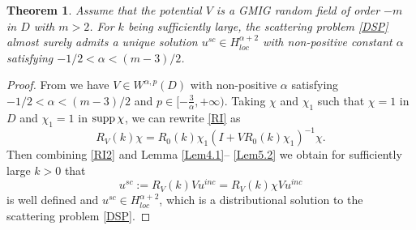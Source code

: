 \documentclass[reqno, 12pt]{amsart}
\newtheorem{Thm}{Theorem}[section]
\numberwithin{equation}{section}
\begin{document}
\begin{Thm}\label{wp}
    Assume that the potential $V$ is a GMIG random field of order $-m$ in $D $ with $m>2$. For $k$ being sufficiently large, the scattering problem \eqref{DSP} almost surely admits a unique solution $u^{sc} \in H^{\alpha+2}_{loc}$ with non-positive constant $\alpha$ satisfying $-1/2<\alpha<(m-3)/2$.
\end{Thm}
\begin{proof} 
From \cite{li2021inverse} we have $V \in W^{\alpha,p}(D)$ with non-positive $\alpha$ satisfying $-1/2<\alpha<(m-3)/2$ and $p \in [-\frac{3}{\alpha},+\infty)$. 
Taking $\chi$ and $\chi_1$ 
such that $\chi =1$ in $D $ and $\chi_1 =1$ in ${\rm supp}\, \chi$, we can rewrite \eqref{RI} as \begin{equation}\label{RI2}
 R_{ V}(k)\chi =  R_0(k) \chi_1 (I + VR_0(k)\chi_1)^{-1}\chi.
\end{equation}  Then combining \eqref{RI2} and Lemma \ref{Lem4.1}-- \ref{Lem5.2} we obtain for sufficiently large $k>0$ that \[
 u^{sc}:= R_{V}(k) Vu^{inc}=R_{ V}(k)\chi Vu^{inc}
\] is well defined and $u^{sc} \in H^{\alpha+2}_{loc}$, which is a distributional solution to the scattering problem \eqref{DSP}. 


\end{proof}
\end{document}
